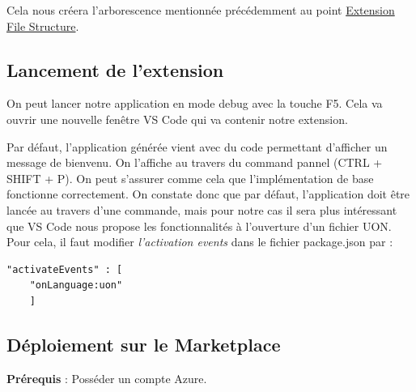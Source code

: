 \documentclass[
    iict, %
    il, %
]{heig-tb}
\begin{document}
Cela nous créera l'arborescence mentionnée précédemment au point \hyperref[Extension File Structure]{Extension File Structure}.

\subsection{Lancement de l'extension}
On peut lancer notre application en mode debug avec la touche F5. Cela va ouvrir une nouvelle fenêtre VS Code qui va contenir notre extension.

Par défaut, l'application générée vient avec du code permettant d'afficher un message de bienvenu. On l'affiche au travers du command pannel (CTRL + SHIFT + P). On peut s'assurer comme cela que l'implémentation de base fonctionne correctement.
On constate donc que par défaut, l'application doit être lancée au travers d'une commande, mais pour notre cas il sera plus intéressant que VS Code nous propose les fonctionnalités à l'ouverture d'un fichier UON.
Pour cela, il faut modifier \emph{l'activation events} dans le fichier package.json par :
\begin{lstlisting}[frame=single]
    "activateEvents" : [
	"onLanguage:uon"
    ]
\end{lstlisting}

\subsection{Déploiement sur le Marketplace}




\textbf{Prérequis} : Posséder un compte Azure.
\end{document}
